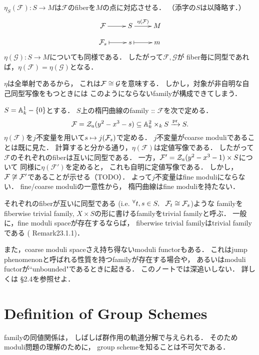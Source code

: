 \documentclass[a4paper]{jsarticle}
\newcommand{\famF}{\mathcal{F}}
\newcommand{\famG}{\mathcal{G}}
\begin{document}
    $\eta_S(\famF): S \to M$は$\famF$のfiberを$M$の点に対応させる．
    （添字の$S$は以降略す．）
    \[
    \xymatrix@R=10pt
    {
        \famF \ar[r]& S \ar[r]^-{\eta(\famF)}& M \\
        \famF_s \ar@{{|}->}[r]& s \ar@{{|}->}[r]& m
    }
    \]
    $\eta(\famG): S \to M$についても同様である．
    したがって$\famF, \famG$が
    fiber毎に同型であれば，$\eta(\famF)=\eta(\famG)$となる．

    $\eta$は全単射であるから，
    これは$\famF \iso \famG$を意味する．
    しかし，対象が非自明な自己同型写像をもつときには
    このようにならないfamilyが構成できてしまう．

    \begin{Example}
        $S=\mathbb{A}^1_k-\{0\}$とする．
        $S$上の楕円曲線のfamily :: $\famF$を次で定める．
        \[
            \famF=\zerosa(y^2-x^3-s) \subseteq \affine^2_k \times_k S
            \xrightarrow{\pr} S.
        \]
        $\eta(\famF)$を$j$不変量を用いて$s \mapsto j(\mathcal{F}_s)$で定める．
        $j$不変量がcoarse moduliであることは既に見た．
        計算すると分かる通り，$\eta(\famF)$は定値写像である．
        したがって$\famF$のそれぞれのfiberは互いに同型である．
        一方，$\famF'=\zerosa(y^2-x^3-1) \times S$について
        同様に$\eta(\famF')$を定めると，
        これも自明に定値写像である．
        しかし，$\famF \not \iso \famF'$であることが示せる（TODO）．
        よって$j$不変量はfine moduliにならない．
        fine/coarse moduliの一意性から，
        楕円曲線はfine moduliを持たない．
    \end{Example}

    それぞれのfiberが互いに同型である
    (i.e. $\Forall{t,s \in S} \famF_t \iso \famF_s$)ような
    familyをfiberwise trivial family, 
    $X \times S$の形に書けるfamilyをtrivial familyと呼ぶ．
    一般に，fine moduli spaceが存在するならば，
    fiberwise trivial familyはtrivial familyである
    (\cite{HarDef} Remark23.1.1)．

    また，coarse moduli spaceさえ持ち得ないmoduli functorもある．
    これはjump phenomenonと呼ばれる性質を持つfamilyが存在する場合や，
    あるいはmoduli fuctorが``unbounded"であるときに起きる．
    このノートでは深追いしない．
    詳しくは\cite{Hos} \S 2.4を参照せよ．

\section{Definition of Group Schemes}
    familyの同値関係は，
    しばしば群作用の軌道分解で与えられる．
    そのためmoduli問題の理解のために，
    group schemeを知ることは不可欠である．
\end{document}
